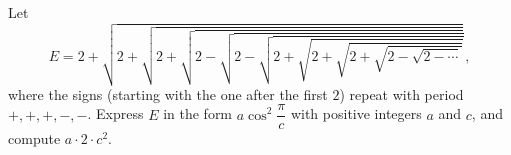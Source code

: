 Let
\[
E=2+\sqrt{2+\sqrt{2+\sqrt{2-\sqrt{2-\sqrt{2+\sqrt{2+\sqrt{2+\sqrt{2-\sqrt{2-\cdots}}}}}}}}}\,,
\]
where the signs (starting with the one after the first $2$) repeat with period $+,+,+,-,-$. Express $E$ in the form $a\cos^2\dfrac{\pi}{c}$ with positive integers $a$ and $c$, and compute $a\cdot2\cdot c^2$.
